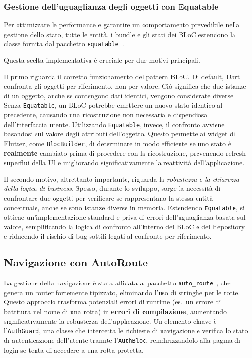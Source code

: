 \subsubsection{Gestione dell'uguaglianza degli oggetti con Equatable}
Per ottimizzare le performance e garantire un comportamento prevedibile nella gestione dello stato, tutte le entità, i bundle e gli stati dei BLoC estendono la classe fornita dal pacchetto \texttt{equatable}~\cite{equatable_package}.

Questa scelta implementativa è cruciale per due motivi principali.

Il primo riguarda il corretto funzionamento del pattern BLoC. Di default, Dart confronta gli oggetti per riferimento, non per valore.
Ciò significa che due istanze di un oggetto, anche se contengono dati identici, vengono considerate diverse.
Senza \texttt{Equatable}, un BLoC potrebbe emettere un nuovo stato identico al precedente, causando una ricostruzione non necessaria e dispendiosa dell'interfaccia utente.
Utilizzando \texttt{Equatable}, invece, il confronto avviene basandosi sul valore degli attributi dell'oggetto.
Questo permette ai widget di Flutter, come \texttt{BlocBuilder}, di determinare in modo efficiente se uno stato è \textbf{realmente} cambiato prima di procedere con la ricostruzione, prevenendo refresh superflui della UI e migliorando significativamente la reattività dell'applicazione.

Il secondo motivo, altrettanto importante, riguarda la \emph{robustezza e la chiarezza della logica di business}.
Spesso, durante lo sviluppo, sorge la necessità di confrontare due oggetti per verificare se rappresentano la stessa entità concettuale, anche se sono istanze diverse in memoria.
Estendendo \texttt{Equatable}, si ottiene un'implementazione standard e priva di errori dell'uguaglianza basata sul valore, semplificando la logica di confronto all'interno dei BLoC e dei Repository e riducendo il rischio di bug sottili legati al confronto per riferimento.

\subsection{Navigazione con AutoRoute}\label{subsec:navigazione-con-autoroute}
La gestione della navigazione è stata affidata al pacchetto \texttt{auto\_route}~\cite{auto_route_package}, che genera un router fortemente tipizzato, eliminando l'uso di stringhe per le rotte.
Questo approccio trasforma potenziali errori di runtime (es.\ un errore di battitura nel nome di una rotta) in \textbf{errori di compilazione}, aumentando significativamente la robustezza dell'applicazione.
Un elemento chiave è l'\texttt{AuthGuard}, una classe che intercetta le richieste di navigazione e verifica lo stato di autenticazione dell'utente tramite l'\texttt{AuthBloc}, reindirizzandolo alla pagina di login se tenta di accedere a una rotta protetta.

